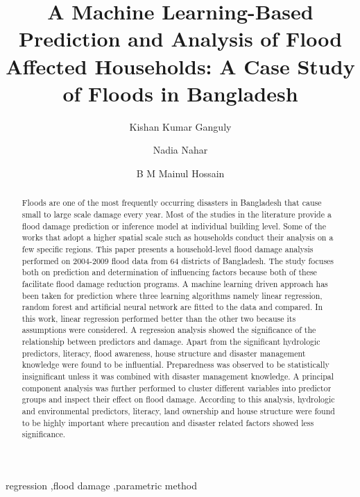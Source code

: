 \documentclass[preprint,review,12pt]{elsarticle}
\begin{document}
\begin{frontmatter}

\title{A Machine Learning-Based Prediction and Analysis of Flood Affected Households: A Case Study of Floods in Bangladesh}

\author{Kishan Kumar Ganguly}

\author{Nadia Nahar}

\author{B M Mainul Hossain}

\address{Institute of Information Technology, University of Dhaka, Dhaka, Bangladesh}

\begin{abstract}
Floods are one of the most frequently occurring disasters in Bangladesh that cause small to large scale damage every year. Most of the studies in the literature provide a flood damage prediction or inference model at individual building level. Some of the works that adopt a higher spatial scale such as households conduct their analysis on a few specific regions. This paper presents a household-level flood damage analysis performed on 2004-2009 flood data from 64 districts of Bangladesh. The study focuses both on prediction and determination of influencing factors because both of these facilitate flood damage reduction programs. A machine learning driven approach has been taken for prediction where three learning algorithms namely linear regression, random forest and artificial neural network are fitted to the data and compared. In this work, linear regression performed better than the other two because its assumptions were considered. A regression analysis showed the significance of the relationship between predictors and damage.  Apart from the significant hydrologic predictors, literacy, flood awareness, house structure and disaster management knowledge were found to be influential. Preparedness was observed to be statistically insignificant unless it was combined with disaster management knowledge. A principal component analysis was further performed to cluster different variables into predictor groups and inspect their effect on flood damage. According to this analysis, hydrologic and environmental predictors, literacy, land ownership and house structure were found to be highly important where precaution and disaster related factors showed less significance. 
\end{abstract}

\begin{keyword}
regression \sep flood damage \sep parametric method
\end{keyword}

\end{frontmatter}
\end{document}
